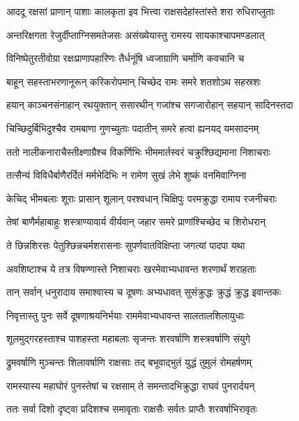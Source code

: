 \twolineshloka
{आददू रक्षसां प्राणान् पाशाः कालकृता इव}
{भित्त्वा राक्षसदेहांस्तांस्ते शरा रुधिराप्लुताः} %

\twolineshloka
{अन्तरिक्षगता रेजुर्दीप्ताग्निसमतेजसः}
{असंख्येयास्तु रामस्य सायकाश्चापमण्डलात्} %

\twolineshloka
{विनिष्पेतुरतीवोग्रा रक्षःप्राणापहारिणः}
{तैर्धनूंषि ध्वजाग्राणि चर्माणि कवचानि च} %

\twolineshloka
{बाहून् सहस्ताभरणानूरून् करिकरोपमान्}
{चिच्छेद रामः समरे शतशोऽथ सहस्रशः} %

\twolineshloka
{हयान् काञ्चनसंनाहान् रथयुक्तान् ससारथीन्}
{गजांश्च सगजारोहान् सहयान् सादिनस्तदा} %

\twolineshloka
{चिच्छिदुर्बिभिदुश्चैव रामबाणा गुणच्युताः}
{पदातीन् समरे हत्वा ह्यनयद् यमसादनम्} %

\twolineshloka
{ततो नालीकनाराचैस्तीक्ष्णाग्रैश्च विकर्णिभिः}
{भीममार्तस्वरं चक्रुश्छिद्यमाना निशाचराः} %

\twolineshloka
{तत्सैन्यं विविधैर्बाणैरर्दितं मर्मभेदिभिः}
{न रामेण सुखं लेभे शुष्कं वनमिवाग्निना} %

\twolineshloka
{केचिद् भीमबलाः शूराः प्रासान् शूलान् परश्वधान्}
{चिक्षिपुः परमक्रुद्धा रामाय रजनीचराः} %

\twolineshloka
{तेषां बाणैर्महाबाहुः शस्त्राण्यावार्य वीर्यवान्}
{जहार समरे प्राणांश्चिच्छेद च शिरोधरान्} %

\twolineshloka
{ते छिन्नशिरसः पेतुश्छिन्नचर्मशरासनाः}
{सुपर्णवातविक्षिप्ता जगत्यां पादपा यथा} %

\twolineshloka
{अवशिष्टाश्च ये तत्र विषण्णास्ते निशाचराः}
{खरमेवाभ्यधावन्त शरणार्थं शराहताः} %

\twolineshloka
{तान् सर्वान् धनुरादाय समाश्वास्य च दूषणः}
{अभ्यधावत् सुसंक्रुद्धः क्रुद्धं क्रुद्ध इवान्तकः} %

\twolineshloka
{निवृत्तास्तु पुनः सर्वे दूषणाश्रयनिर्भयाः}
{राममेवाभ्यधावन्त सालतालशिलायुधाः} %

\twolineshloka
{शूलमुद्गरहस्ताश्च पाशहस्ता महाबलाः}
{सृजन्तः शरवर्षाणि शस्त्रवर्षाणि संयुगे} %

\twolineshloka
{द्रुमवर्षाणि मुञ्चन्तः शिलावर्षाणि राक्षसाः}
{तद् बभूवाद्भुतं युद्धं तुमुलं रोमहर्षणम्} %

\twolineshloka
{रामस्यास्य महाघोरं पुनस्तेषां च रक्षसाम्}
{ते समन्तादभिक्रुद्धा राघवं पुनरार्दयन्} %

\twolineshloka
{ततः सर्वा दिशो दृष्ट्वा प्रदिशश्च समावृताः}
{राक्षसैः सर्वतः प्राप्तैः शरवर्षाभिरावृतः} %

